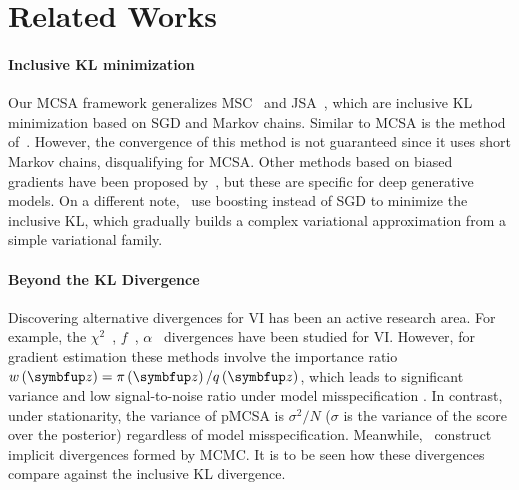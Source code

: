 \vspace{-0.05in}
\section{Related Works}\label{section:related}
\vspace{-0.1in}
\paragraph{Inclusive KL minimization}
Our MCSA framework generalizes MSC~\citep{NEURIPS2020_b2070693} and JSA~\citet{pmlr-v124-ou20a}, which are inclusive KL minimization based on SGD and Markov chains.
Similar to MCSA is the method of~\citet{li_approximate_2017}.
However, the convergence of this method is not guaranteed since it uses short Markov chains, disqualifying for MCSA.
Other methods based on biased gradients have been proposed by~\citet{DBLP:journals/corr/BornscheinB14,le_revisiting_2019}, but these are specific for deep generative models.
On a different note,~\citet{pmlr-v161-jerfel21a} use boosting instead of SGD to minimize the inclusive KL, which gradually builds a complex variational approximation from a simple variational family.

\vspace{-0.1in}
\paragraph{Beyond the KL Divergence}
Discovering alternative divergences for VI has been an active research area.
For example, the \(\chi^2\)~\citep{NIPS2017_35464c84}, \(f\)~\citep{NEURIPS2018_1cd138d0, NEURIPS2020_c928d86f}, \(\alpha\)~\citep{NIPS2016_7750ca35, regli_alphabeta_2018, pmlr-v48-hernandez-lobatob16} divergences have been studied for VI.
However, for gradient estimation these methods involve the importance ratio \(w\left(\vz\right) = \pi\left(\vz\right)/q\left(\vz\right)\), which leads to significant variance and low signal-to-noise ratio under model misspecification \citep{geffner2021empirical, pmlr-v139-geffner21a}.
In contrast, under stationarity, the variance of pMCSA is \({\sigma^2}/{N}\) (\(\sigma\) is the variance of the score over the posterior) regardless of model misspecification.
Meanwhile,~\citet{pmlr-v37-salimans15,pmlr-v97-ruiz19a,NEURIPS2021_05f971b5,NEURIPS2021_a1a609f1} construct implicit divergences formed by MCMC.
It is to be seen how these divergences compare against the inclusive KL divergence.

\vspace{-0.1in}
